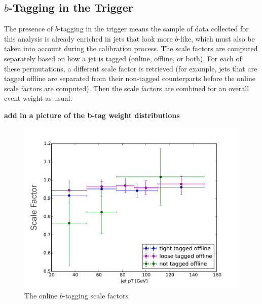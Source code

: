 \subsection{$b$-Tagging in the Trigger}
The presence of $b$-tagging in the trigger means the sample of data collected for this 
analysis is already enriched in jets that look more $b$-like, which must also 
be taken into account during the calibration process.  The scale factors
are computed separately based on how a jet is tagged (online, offline, or both). 
For each of these permutations, a different scale factor is retrieved (for
example, jets that are tagged offline are separated from their non-tagged counterparts
before the online scale factors are computed).  Then the scale factors are combined
for an overall event weight as usual.  


\textbf{add in a picture of the b-tag weight distributions}



\begin{figure}
    \center
  \includegraphics[width=0.85\linewidth]{Systematics/online_SFs.pdf}
  \caption{The online $b$-tagging scale factors\label{fig:online_sfs}}    
\end{figure}                                                                                                                        













